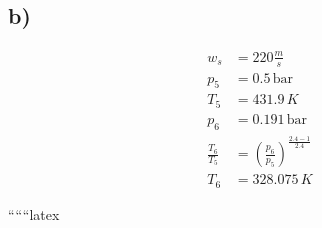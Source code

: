 

\subsection*{b)}

\begin{align*}
    w_s &= 220 \frac{m}{s} \\
    p_5 &= 0.5 \, \text{bar} \\
    T_5 &= 431.9 \, K \\
    p_6 &= 0.191 \, \text{bar} \\
    \frac{T_6}{T_5} &= \left( \frac{p_6}{p_5} \right)^{\frac{2.4-1}{2.4}} \\
    T_6 &= 328.075 \, K
\end{align*}

``````latex